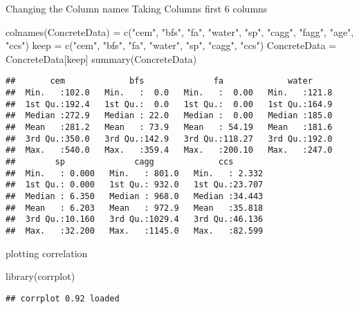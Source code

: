 \documentclass[
]{article}
\newenvironment{Shaded}{\begin{snugshade}}{\end{snugshade}}
\newcommand{\FunctionTok}[1]{\textcolor[rgb]{0.00,0.00,0.00}{#1}}
\newcommand{\NormalTok}[1]{#1}
\newcommand{\OtherTok}[1]{\textcolor[rgb]{0.56,0.35,0.01}{#1}}
\newcommand{\StringTok}[1]{\textcolor[rgb]{0.31,0.60,0.02}{#1}}
\begin{document}
Changing the Column names Taking Columns first 6 columns

\begin{Shaded}
\begin{Highlighting}[]
\FunctionTok{colnames}\NormalTok{(ConcreteData) }\OtherTok{=} \FunctionTok{c}\NormalTok{(}\StringTok{"cem"}\NormalTok{, }\StringTok{"bfs"}\NormalTok{, }\StringTok{"fa"}\NormalTok{, }\StringTok{"water"}\NormalTok{, }\StringTok{"sp"}\NormalTok{, }\StringTok{"cagg"}\NormalTok{, }\StringTok{"fagg"}\NormalTok{, }\StringTok{"age"}\NormalTok{, }\StringTok{"ccs"}\NormalTok{)}
\NormalTok{keep }\OtherTok{=} \FunctionTok{c}\NormalTok{(}\StringTok{"cem"}\NormalTok{, }\StringTok{"bfs"}\NormalTok{, }\StringTok{"fa"}\NormalTok{, }\StringTok{"water"}\NormalTok{, }\StringTok{"sp"}\NormalTok{, }\StringTok{"cagg"}\NormalTok{, }\StringTok{"ccs"}\NormalTok{)}
\NormalTok{ConcreteData }\OtherTok{=}\NormalTok{ ConcreteData[keep]}
\FunctionTok{summary}\NormalTok{(ConcreteData)}
\end{Highlighting}
\end{Shaded}

\begin{verbatim}
##       cem             bfs              fa             water      
##  Min.   :102.0   Min.   :  0.0   Min.   :  0.00   Min.   :121.8  
##  1st Qu.:192.4   1st Qu.:  0.0   1st Qu.:  0.00   1st Qu.:164.9  
##  Median :272.9   Median : 22.0   Median :  0.00   Median :185.0  
##  Mean   :281.2   Mean   : 73.9   Mean   : 54.19   Mean   :181.6  
##  3rd Qu.:350.0   3rd Qu.:142.9   3rd Qu.:118.27   3rd Qu.:192.0  
##  Max.   :540.0   Max.   :359.4   Max.   :200.10   Max.   :247.0  
##        sp              cagg             ccs        
##  Min.   : 0.000   Min.   : 801.0   Min.   : 2.332  
##  1st Qu.: 0.000   1st Qu.: 932.0   1st Qu.:23.707  
##  Median : 6.350   Median : 968.0   Median :34.443  
##  Mean   : 6.203   Mean   : 972.9   Mean   :35.818  
##  3rd Qu.:10.160   3rd Qu.:1029.4   3rd Qu.:46.136  
##  Max.   :32.200   Max.   :1145.0   Max.   :82.599
\end{verbatim}

plotting correlation

\begin{Shaded}
\begin{Highlighting}[]
\FunctionTok{library}\NormalTok{(corrplot)}
\end{Highlighting}
\end{Shaded}

\begin{verbatim}
## corrplot 0.92 loaded
\end{verbatim}
\end{document}
